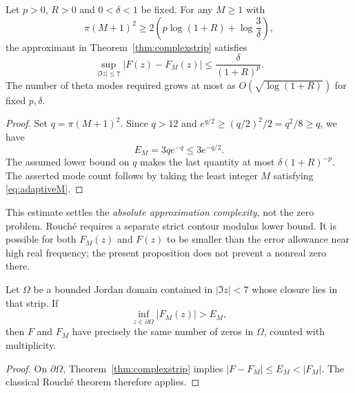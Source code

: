 \begin{proposition}\label{prop:adaptive}
Let $p>0$, $R>0$ and
$0<\delta<1$ be fixed.
For any $M\ge1$ with
\begin{equation}
\pi(M+1)^2\ge
2\left(p\log(1+R)+
\log\frac3\delta\right),
\label{eq:adaptiveM}
\end{equation}
the approximant in
Theorem~\ref{thm:complexstrip}
satisfies
\[
\sup_{|\Im z|\le7}|F(z)-F_M(z)|
\le\frac{\delta}{(1+R)^p}.
\]
The number of theta modes
required grows at most as
$O(\sqrt{\log(1+R)})$ for
fixed $p,\delta$.
\end{proposition}
\begin{proof}
Set $q=\pi(M+1)^2$.
Since $q>12$ and
$e^{q/2}\ge(q/2)^2/2
=q^2/8\ge q$,
we have
\[
E_M=3q e^{-q}
\le3e^{-q/2}.
\]
The assumed lower bound
on $q$ makes the last
quantity at most
$\delta(1+R)^{-p}$.
The asserted mode count
follows by taking the
least integer $M$ satisfying
\eqref{eq:adaptiveM}.
\end{proof}
This estimate settles the
\emph{absolute approximation
complexity}, not the zero
problem. Rouch\'e requires
a separate strict contour
modulus lower bound. It is
possible for both $F_M(z)$
and $F(z)$ to be smaller
than the error allowance
near high real frequency;
the present proposition
does not prevent a nonreal
zero there.

\begin{corollary}
\label{cor:rouche}
Let $\Omega$ be a bounded Jordan
domain contained in $|\Im z|<7$
whose closure lies in that strip.
If
\begin{equation}
\boxed{
\inf_{z\in\partial\Omega}|F_M(z)|>E_M,
}
\label{eq:rouchegap}
\end{equation}
then $F$ and $F_M$ have precisely
the same number of zeros in
$\Omega$, counted with multiplicity.
\end{corollary}
\begin{proof}
On $\partial\Omega$,
Theorem~\ref{thm:complexstrip}
implies $|F-F_M|\le E_M<|F_M|$.
The classical Rouch\'e theorem
therefore applies.
\end{proof}

